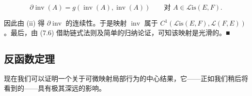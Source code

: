 \begin{proposition}
\begin{subitems}
\begin{equation}
\partial\operatorname{inv}(A) = g\left(\operatorname{inv}(A), \operatorname{inv}(A)\right) \qquad \text{对 } A \in \mathcal{L}\mathrm{is}(E, F) .\tag{7.6}
\end{equation}

因此由 (ii) 得 $ \partial\operatorname{inv} $ 的连续性。于是映射 $ \operatorname{inv} $ 属于 $ C^{1}\left(\mathcal{L}\mathrm{is}(E, F), \mathcal{L}(F, E)\right) $。最后，由 (7.6) 借助链式法则及简单的归纳论证，可知该映射是光滑的。\nobreak\hspace{0.35em}■

\end{subitems}

\end{proposition}

\subsection*{反函数定理}

现在我们可以证明一个关于可微映射局部行为的中心结果，它——正如我们稍后将看到的——具有极其深远的影响。

